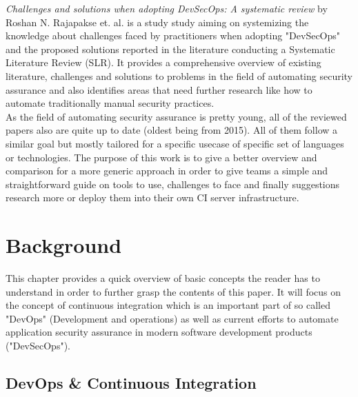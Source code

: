 \documentclass[conference]{IEEEtran}
\begin{document}
\noindent
\textit{Challenges and solutions when adopting DevSecOps: A systematic review} \cite{relatedpaper6} by Roshan N. Rajapakse et. al. is a study study aiming on systemizing the knowledge about challenges faced by practitioners when adopting "DevSecOps" and the proposed solutions reported in the literature conducting a Systematic Literature Review (SLR). It provides a comprehensive overview of existing literature, challenges and solutions to problems in the field of automating security assurance and also identifies areas that need further research like how to automate traditionally manual security practices.\\

As the field of automating security assurance is pretty young, all of the reviewed papers also are quite up to date (oldest being from 2015). All of them follow a similar goal but mostly tailored for a specific usecase of specific set of languages or technologies. The purpose of this work is to give a better overview and comparison for a more generic approach in order to give teams a simple and straightforward guide on tools to use, challenges to face and finally suggestions research more or deploy them into their own CI server infrastructure.


\section{Background}

This chapter provides a quick overview of basic concepts the reader has to understand in order to further grasp the contents of this paper. It will focus on the concept of continuous integration which is an important part of so called "DevOps" (Development and operations) as well as current efforts to automate application security assurance in modern software development products ("DevSecOps").

\subsection{DevOps \& Continuous Integration}
\end{document}
